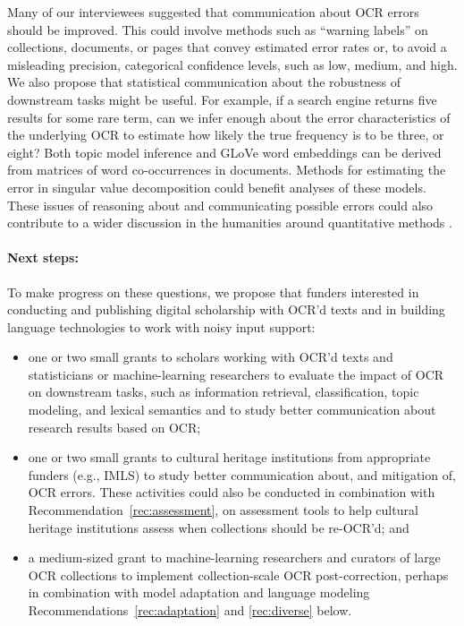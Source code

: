 \documentclass[twoside,11pt]{report}
\begin{document}
Many of our interviewees suggested that communication about OCR errors should be improved. This could involve methods such as ``warning labels'' on collections, documents, or pages that convey estimated error rates or, to avoid a misleading precision, categorical confidence levels, such as low, medium, and high. We also propose that statistical communication about the robustness of downstream tasks might be useful. For example, if a search engine returns five results for some rare term, can we infer enough about the error characteristics of the underlying OCR to estimate how likely the true frequency is to be three, or eight? Both topic model inference and GLoVe word embeddings can be derived from matrices of word co-occurrences in documents. Methods for estimating the error in singular value decomposition could benefit analyses of these models. These issues of reasoning about and communicating possible errors could also contribute to a wider discussion in the humanities around quantitative methods \citep[\emph{passim}]{piper18:_enumer}.

\paragraph{Next steps:} To make progress on these questions, we propose that funders interested in conducting and publishing digital scholarship with OCR'd texts and in building language technologies to work with noisy input support:
\begin{itemize}

\item one or two small grants to scholars working with OCR'd texts and statisticians or machine-learning researchers to evaluate the impact of OCR on downstream tasks, such as information retrieval, classification, topic modeling, and lexical semantics and to study better communication about research results based on OCR;

\item one or two small grants to cultural heritage institutions from appropriate funders (e.g., IMLS) to study better communication about, and mitigation of, OCR errors. These activities could also be conducted in combination with Recommendation~\ref{rec:assessment}, on assessment tools to help cultural heritage institutions assess when collections should be re-OCR'd; and

\item a medium-sized grant to machine-learning researchers and curators of large OCR collections to implement collection-scale OCR post-correction, perhaps in combination with model adaptation and language modeling Recommendations~\ref{rec:adaptation} and \ref{rec:diverse} below.

\end{itemize}
\end{document}
